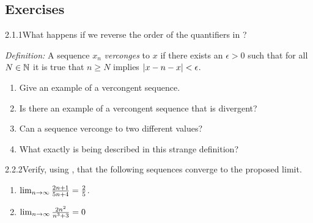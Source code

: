 \renewcommand{\theenumi}{\alph{enumi}}
\renewcommand{\labelenumi}{(\theenumi)}
\subsection{Exercises}

\begin{exercise}
    {2.1.1}What happens if we reverse the order of the quantifiers in ?

    \textit{Definition:} A sequence \(x_{n}\) \textit{verconges} to \(x\) if there exists an \(\epsilon >0\) such that for all \(N \in \mathbb{N}\) it is true that \(n \geq N\) implies \(\left|x-n - x\right| < \epsilon \).
    \begin{enumerate}
        \item Give an example of a vercongent sequence.
        \item Is there an example of a vercongent sequence that is divergent?
        \item Can a sequence verconge to two different values?
        \item What exactly is being described in this strange definition?
    \end{enumerate}
\end{exercise}


\begin{exercise}
    {2.2.2}Verify, using , that
    the following sequences converge to the proposed limit.
    \begin{enumerate}
        \item \(\lim_{n \rightarrow \infty}\frac{2n + 1}{5n + 4} = \frac{2}{5}\).
        \item \(\lim_{n \rightarrow \infty}\frac{2n^2}{n^3+3} = 0\)
    \end{enumerate}
\end{exercise}

